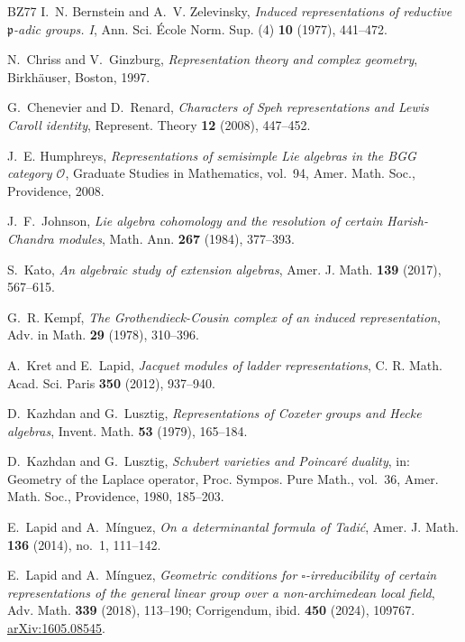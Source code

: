 \documentclass[a4paper,12pt,leqno]{amsart}
\theoremstyle{plain}
\theoremstyle{definition}
\theoremstyle{definition}
\begin{document}
\begin{thebibliography}{BZ77}
 I.~N. Bernstein and A.~V. Zelevinsky, \emph{Induced representations of
reductive ${\mathfrak p}$-adic groups. I}, Ann. Sci. \'Ecole Norm. Sup. (4) \textbf{10} (1977), 441--472.

 N.~Chriss and V.~Ginzburg, \emph{Representation theory and complex geometry},
Birkh\"auser, Boston, 1997.

 G.~Chenevier and D.~Renard, \emph{Characters of Speh representations and Lewis
Caroll identity}, Represent. Theory \textbf{12} (2008), 447--452.

 J.~E. Humphreys, \emph{Representations of semisimple Lie algebras in the BGG
category $\mathcal{O}$}, Graduate Studies in Mathematics, vol.~94, Amer. Math. Soc., Providence, 2008.

 J.~F.~Johnson, \emph{Lie algebra cohomology and the resolution of certain
Harish-Chandra modules}, Math. Ann. \textbf{267} (1984), 377--393.

 S.~Kato, \emph{An algebraic study of extension algebras}, Amer. J. Math.
\textbf{139} (2017), 567--615.

 G.~R. Kempf, \emph{The Grothendieck-Cousin complex of an induced
representation}, Adv. in Math. \textbf{29} (1978), 310--396.

 A.~Kret and E.~Lapid, \emph{Jacquet modules of ladder representations}, C. R.
Math. Acad. Sci. Paris \textbf{350} (2012), 937--940.

 D.~Kazhdan and G.~Lusztig, \emph{Representations of Coxeter groups and Hecke
algebras}, Invent. Math. \textbf{53} (1979), 165--184.

 D.~Kazhdan and G.~Lusztig, \emph{Schubert varieties and Poincar\'e duality},
in: Geometry of the Laplace operator, Proc. Sympos. Pure Math., vol.~36, Amer. Math. Soc.,
Providence, 1980, 185--203.

 E.~Lapid and A.~M\'inguez, \emph{On a determinantal formula of Tadi\'c}, Amer.
J. Math. \textbf{136} (2014), no.~1, 111--142.

 E.~Lapid and A.~M\'inguez, \emph{Geometric conditions for
$\square$-irreducibility of certain representations of the general linear group over a
non-archimedean local field}, Adv. Math. \textbf{339} (2018), 113--190; Corrigendum, ibid.
\textbf{450} (2024), 109767. \href{https://arxiv.org/abs/1605.08545}{arXiv:1605.08545}.


\end{thebibliography}
\end{document}
